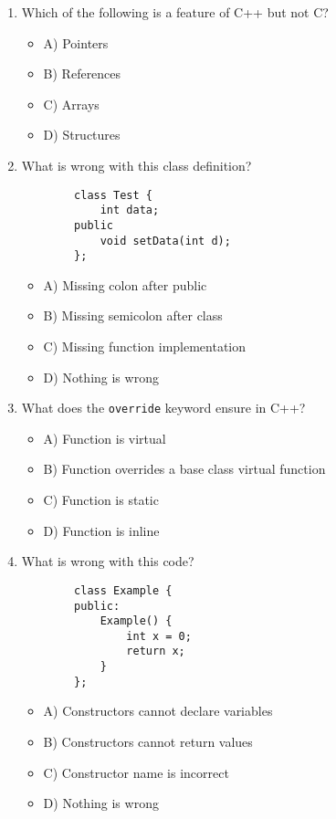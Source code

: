 \documentclass[a4paper,12pt]{article}
\begin{document}
\begin{enumerate}
    \item Which of the following is a feature of C++ but not C?
    \begin{itemize}
        \item A) Pointers
        \item B) References
        \item C) Arrays
        \item D) Structures
    \end{itemize}

    \item What is wrong with this class definition?

    \lstset{language=C++}
    \begin{lstlisting}
        class Test {
            int data;
        public
            void setData(int d);
        };
    \end{lstlisting}
    
    \begin{itemize}
        \item A) Missing colon after public
        \item B) Missing semicolon after class
        \item C) Missing function implementation
        \item D) Nothing is wrong
    \end{itemize}

    \item What does the \verb|override| keyword ensure in C++?
    \begin{itemize}
        \item A) Function is virtual
        \item B) Function overrides a base class virtual function
        \item C) Function is static
        \item D) Function is inline
    \end{itemize}

    \item What is wrong with this code?

    \lstset{language=C++}
    \begin{lstlisting}
        class Example {
        public:
            Example() {
                int x = 0;
                return x;
            }
        };
    \end{lstlisting}
    
    \begin{itemize}
        \item A) Constructors cannot declare variables
        \item B) Constructors cannot return values
        \item C) Constructor name is incorrect
        \item D) Nothing is wrong
    \end{itemize}


\end{enumerate}
\end{document}
